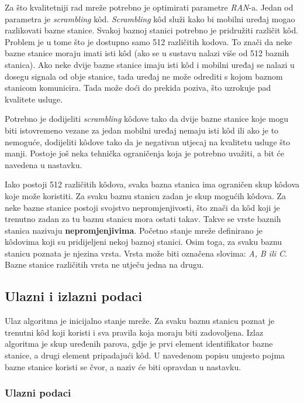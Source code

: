 \documentclass[times, utf8, diplomski, numeric]{fer}
\begin{document}
Za što kvalitetniji rad mreže potrebno je optimirati parametre \emph{RAN}-a. Jedan od parametra je \emph{scrambling} k\^{o}d. \emph{Scrambling} k\^{o}d služi kako bi mobilni uređaj mogao razlikovati bazne stanice. Svakoj baznoj stanici potrebno je pridružiti različit k\^{o}d. Problem je u tome što je dostupno samo 512 različitih kodova. To znači da neke bazne stanice moraju imati isti k\^{o}d (ako se u sustavu nalazi više od 512 baznih stanica). Ako neke dvije bazne stanice imaju isti k\^{o}d i mobilni uređaj se nalazi u dosegu signala od obje stanice, tada uređaj ne može odrediti s kojom baznom stanicom komunicira. Tada može doći do prekida poziva, što uzrokuje pad kvalitete usluge.

Potrebno je dodijeliti \emph{scrambling} k\^{o}dove tako da dvije bazne stanice koje mogu biti istovremeno vezane za jedan mobilni uređaj nemaju isti k\^{o}d ili ako je to nemoguće, dodijeliti k\^{o}dove tako da je negativan utjecaj na kvalitetu usluge što manji. Postoje još neka tehnička ograničenja koja je potrebno uvažiti, a bit će navedena u nastavku.

Iako postoji 512 različitih k\^{o}dova, svaka bazna stanica ima ograničen skup k\^{o}dova koje može koristiti. Za svaku baznu stanicu zadan je skup mogućih k\^{o}dova. Za neke bazne stanice postoji svojstvo nepromjenjivosti, što znači da k\^{o}d koji je trenutno zadan za tu baznu stanicu mora ostati takav. Takve se vrste baznih stanica nazivaju \textbf{nepromjenjivima}. Početno stanje mreže definirano je k\^{o}dovima koji su pridijeljeni nekoj baznoj stanici. Osim toga, za svaku baznu stanicu poznata je njezina vrsta. Vrsta može biti označena slovima: \emph{A, B ili C}. Bazne stanice različitih vrsta ne utječu jedna na drugu.

\subsection{Ulazni i izlazni podaci}

Ulaz algoritma je inicijalno stanje mreže. Za svaku baznu stanicu poznat je trenutni k\^{o}d koji koristi i sva pravila koja moraju biti zadovoljena. Izlaz algoritma je skup uređenih parova, gdje je prvi element identifikator bazne stanice, a drugi element pripadajući k\^{o}d. U navedenom popisu umjesto pojma bazne stanice koristi se čvor, a naziv će biti opravdan u nastavku.

\subsubsection{Ulazni podaci}
\end{document}

